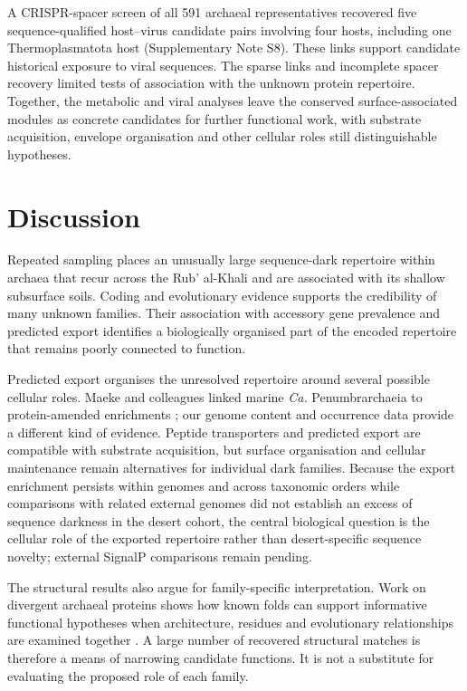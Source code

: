 \documentclass[11pt]{article}
\begin{document}
A CRISPR-spacer screen of all 591 archaeal representatives recovered five sequence-qualified host--virus candidate pairs involving four hosts, including one Thermoplasmatota host (Supplementary Note S8). These links support candidate historical exposure to viral sequences. The sparse links and incomplete spacer recovery limited tests of association with the unknown protein repertoire. Together, the metabolic and viral analyses leave the conserved surface-associated modules as concrete candidates for further functional work, with substrate acquisition, envelope organisation and other cellular roles still distinguishable hypotheses.

\section*{Discussion}

Repeated sampling places an unusually large sequence-dark repertoire within archaea that recur across the Rub' al-Khali and are associated with its shallow subsurface soils. Coding and evolutionary evidence supports the credibility of many unknown families. Their association with accessory gene prevalence and predicted export identifies a biologically organised part of the encoded repertoire that remains poorly connected to function.

Predicted export organises the unresolved repertoire around several possible cellular roles. Maeke and colleagues linked marine \emph{Ca.} Penumbrarchaeia to protein-amended enrichments \citep{maeke2025thermoplasmatota}; our genome content and occurrence data provide a different kind of evidence. Peptide transporters and predicted export are compatible with substrate acquisition, but surface organisation and cellular maintenance remain alternatives for individual dark families. Because the export enrichment persists within genomes and across taxonomic orders while comparisons with related external genomes did not establish an excess of sequence darkness in the desert cohort, the central biological question is the cellular role of the exported repertoire rather than desert-specific sequence novelty; external SignalP comparisons remain pending.

The structural results also argue for family-specific interpretation. Work on divergent archaeal proteins shows how known folds can support informative functional hypotheses when architecture, residues and evolutionary relationships are examined together \citep{sussfeld2025divergent,schaeffer2026archaeal}. A large number of recovered structural matches is therefore a means of narrowing candidate functions. It is not a substitute for evaluating the proposed role of each family.
\end{document}
